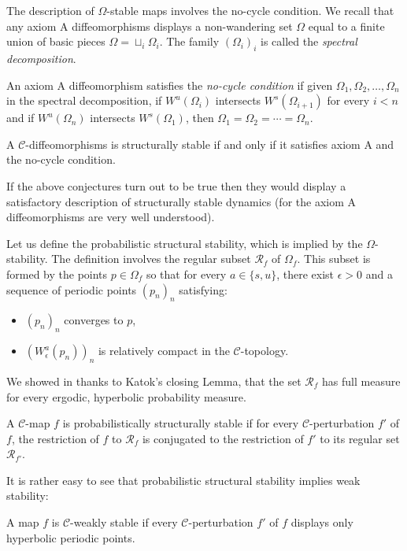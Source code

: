 \documentclass[11pt,openany,leqno]{article}
\begin{document}


The description of $\Omega$-stable maps involves the no-cycle condition. We recall that any axiom A diffeomorphisms displays a non-wandering set $\Omega$ equal to a finite union of basic pieces $\Omega= \sqcup_i \Omega_i$.  The family  $(\Omega_i)_i$ is called the \emph{spectral decomposition}.  

 \begin{defi}
An axiom A  diffeomorphism satisfies the \emph{no-cycle condition} if given $\Omega_1,\Omega_2, \dots, \Omega_n$ in the spectral decomposition, if $W^u(\Omega_i)$ intersects $W^s(\Omega_{i+1})$ for every $i<n$ and if 
$W^u(\Omega_n)$ intersects $W^s(\Omega_{1})$, then $\Omega_1=\Omega_2= \cdots = \Omega_n$.
\end{defi}

\begin{conj}
A $\mathcal C$-diffeomorphisms is structurally stable if and only if it satisfies  axiom A and the no-cycle condition.
\end{conj}

If the above conjectures turn out to be true then they would display a satisfactory description of structurally stable dynamics (for the axiom A diffeomorphisms are very well understood).





Let us define the probabilistic structural stability, which is implied by the 
 $\Omega$-stability. The definition involves the regular subset $\mathcal R_f$ of $\Omega_f$. This subset is formed by the points $p\in \Omega_f$ so that for every $a\in \{s,u\}$, there exist $\epsilon>0$ and a sequence of periodic points $(p_n)_n$ satisfying:
 \begin{itemize}
 \item $(p_n)_n$ converges to $p$,
 \item $(W^a_{\epsilon}(p_n))_n$ is relatively compact in the $\mathcal C$-topology.
\end{itemize} 
We showed in \cite{BD14} thanks to Katok's closing Lemma, that the set $\mathcal R_f$ has full measure for every ergodic, hyperbolic probability measure.
\begin{defi} A $\mathcal C$-map $f$ is probabilistically structurally stable  if for every $\mathcal C$-perturbation $f'$ of $f$,  the restriction of $f$ to $\mathcal R_f$ is conjugated to the restriction of $f'$ to its regular set $\mathcal R_{f'}$.
\end{defi} 
It is rather easy to see that probabilistic structural stability implies weak stability:
\begin{defi} A map $f$ is $\mathcal C$-weakly stable  if every $\mathcal C$-perturbation $f'$ of $f$ displays only hyperbolic  periodic points.
\end{defi}
\end{document}
